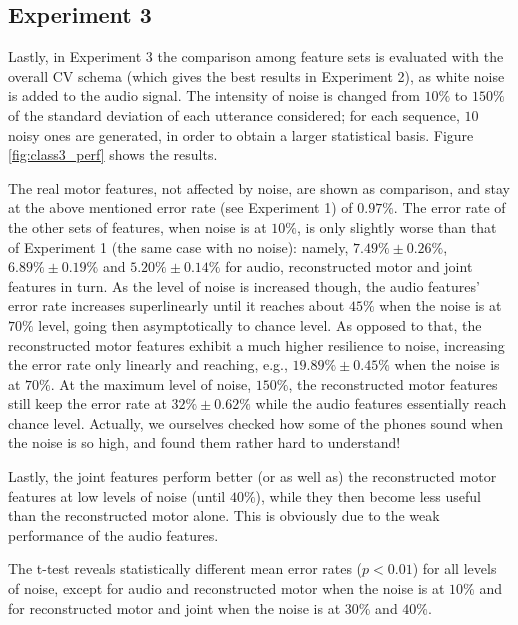 \subsection{Experiment 3}
\label{subsec:exp3}

Lastly, in Experiment 3 the comparison among feature sets is evaluated with the
overall CV schema (which gives the best results in Experiment 2), as white noise is added
to the audio signal. The intensity of noise is changed from $10\%$ to $150\%$ of
the standard deviation of each utterance considered; for each sequence, $10$ noisy
ones are generated, in order to obtain a larger statistical basis.
Figure \ref{fig:class3_perf} shows the results.

The real motor features, not affected by noise, are shown as comparison, and stay at
the above mentioned error rate (see Experiment 1) of $0.97\%$. The error rate of the
other sets of features, when noise is at $10\%$, is only slightly worse than that of
Experiment 1 (the same case with no noise): namely,
$7.49\% \pm 0.26\%$, 
$6.89\% \pm 0.19\%$ and 
$5.20\% \pm 0.14\%$ for audio, reconstructed motor and joint features in turn.
As the level of noise is increased though, the audio features' error rate
increases superlinearly until it reaches about $45\%$ when the noise is at $70\%$
level, going then asymptotically to chance level. As opposed to that, the reconstructed
motor features exhibit a much higher resilience to noise, increasing the error rate
only linearly and reaching, e.g., $19.89\% \pm 0.45\%$ when the noise is at $70\%$.
At the maximum level of noise, $150\%$, the reconstructed motor features still keep
the error rate at $32\% \pm 0.62\%$ while the audio features essentially reach chance
level. Actually, we ourselves checked how some of the phones sound when the noise is
so high, and found them rather hard to understand!

Lastly, the joint features perform better (or as well as) the reconstructed motor features
at low levels of noise (until $40\%$), while they then become less useful than the
reconstructed motor alone. This is obviously due to the weak performance of the audio
features.

The t-test reveals statistically different mean error rates ($p<0.01$) for all levels of
noise, except for audio and reconstructed motor when the noise
is at $10\%$ and for reconstructed motor and joint when the noise is at $30\%$
and $40\%$.

